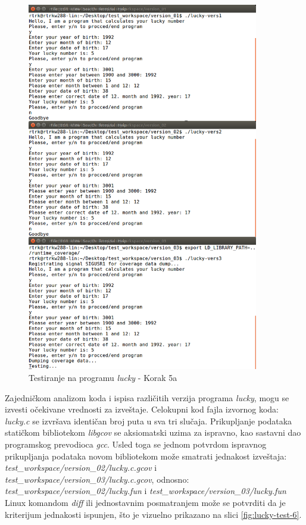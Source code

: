 \documentclass[12pt,oneside]{memoir}
\newcommand{\strano}[1]{\textit{#1}}
\begin{document}
\begin{figure}[!ht]
  \centering
  \includegraphics[width=0.9\textwidth]{img/lucky5-ng.png}
  \caption{Testiranje na programu \strano{lucky} - Korak 5a}
  \label{fig:lucky-test-5}
\end{figure}

Zajedničkom analizom koda i ispisa različitih verzija programa \strano{lucky}, mogu se izvesti očekivane vrednosti za izveštaje. Celokupni kod fajla izvornog koda: \strano{lucky.c} se izvršava identičan broj puta u sva tri slučaja. Prikupljanje podataka statičkom bibliotekom \strano{libgcov} se aksiomatski uzima za ispravno, kao sastavni dao programskog prevodioca \strano{gcc}. Usled toga se jednom potvrdom ispravnog prikupljanja podataka novom bibliotekom može smatrati jednakost izveštaja: \\ \strano{test\_workspace/version\_02/lucky.c.gcov} i \strano{test\_workspace/version\_03/lucky.c.gcov}, odnosno: \\
\strano{test\_workspace/version\_02/lucky.fun} i \strano{test\_workspace/version\_03/lucky.fun}  \\
Linux komandom \strano{diff} ili jednostavnim posmatranjem može se potvrditi da je kriterijum jednakosti ispunjen, što je vizuelno prikazano na slici \ref{fig:lucky-test-6}.
\end{document}

